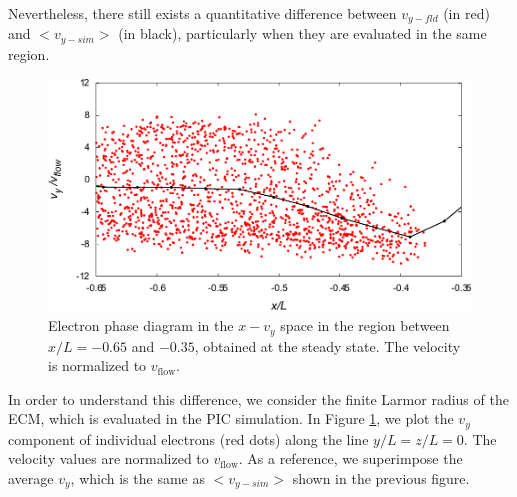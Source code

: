 \documentclass[draft,jgrga]{agutex2015}
\begin{document}
\begin{article}
Nevertheless, there still exists a quantitative difference between 
$v_{y-fld}$ (in red) and $<v_{y-sim}>$ (in black),
particularly when they are evaluated in the same region.
\begin{figure}
\centering
\noindent\includegraphics[width=15cm]{./figures/Fig_9_bb-crop.pdf}
\caption{
Electron phase diagram in the $x-v_{y}$ space in the region between $x/L =-0.65$ and $-0.35$,
obtained at the steady state.
The velocity is normalized to $v_\mathrm{flow}$.
}
\label{fig:9}
\end{figure}
In order to understand this difference, 
we consider the finite Larmor radius of the ECM, 
which is evaluated in the PIC simulation. 
In Figure \ref{fig:9}, 
we plot the $v_y$ component of individual electrons (red dots)
along the line $y/L=z/L=0$.
The velocity values are normalized to $v_\mathrm{flow}$.
As a reference, 
we superimpose the average $v_y$, which is the same as $<v_{y-sim}>$ 
shown in the previous figure.
%


\end{article}
\end{document}
